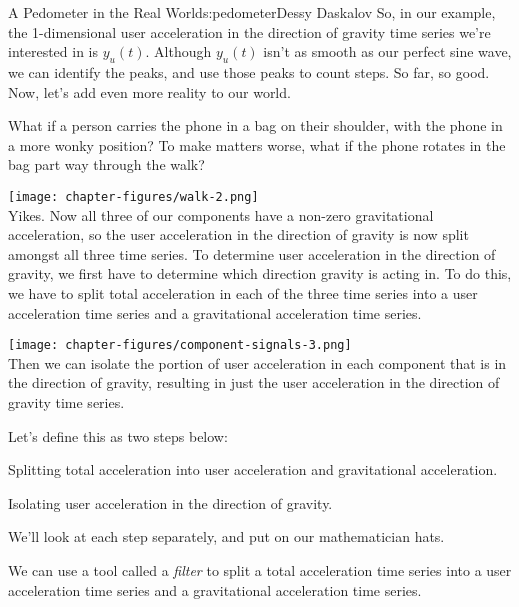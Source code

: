 \begin{aosachapter}{A Pedometer in the Real World}{s:pedometer}{Dessy Daskalov}
So, in our example, the 1-dimensional user acceleration in the direction
of gravity time series we're interested in is $y_{u}(t)$. Although
$y_{u}(t)$ isn't as smooth as our perfect sine wave, we can identify the
peaks, and use those peaks to count steps. So far, so good. Now, let's
add even more reality to our world.

\label{people-are-complicated-creatures}

What if a person carries the phone in a bag on their shoulder, with the
phone in a more wonky position? To make matters worse, what if the phone
rotates in the bag part way through the walk?

\texttt{[image: chapter-figures/walk-2.png]}\\ Yikes. Now all three of
our components have a non-zero gravitational acceleration, so the user
acceleration in the direction of gravity is now split amongst all three
time series. To determine user acceleration in the direction of gravity,
we first have to determine which direction gravity is acting in. To do
this, we have to split total acceleration in each of the three time
series into a user acceleration time series and a gravitational
acceleration time series.

\texttt{[image: chapter-figures/component-signals-3.png]}\\ Then we can
isolate the portion of user acceleration in each component that is in
the direction of gravity, resulting in just the user acceleration in the
direction of gravity time series.

Let's define this as two steps below:

\begin{aosaenumerate}
\def\labelenumi{\arabic{enumi}.}

\item
  Splitting total acceleration into user acceleration and gravitational
  acceleration.
\item
  Isolating user acceleration in the direction of gravity.
\end{aosaenumerate}

We'll look at each step separately, and put on our mathematician hats.

\label{splitting-total-acceleration-into-user-acceleration-and-gravitational-acceleration}

We can use a tool called a \emph{filter} to split a total acceleration
time series into a user acceleration time series and a gravitational
acceleration time series.


\end{aosachapter}
